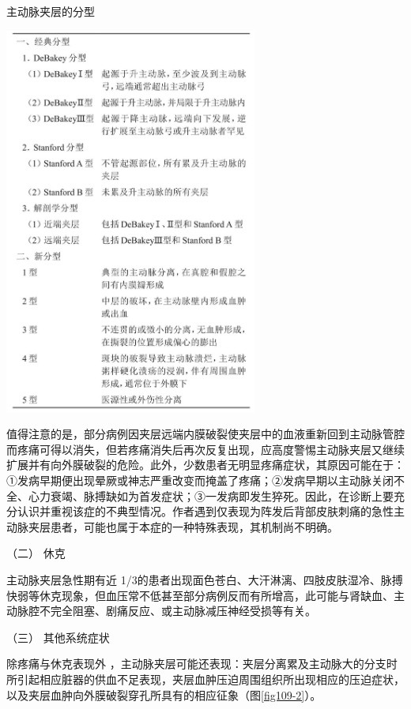 \begin{table}[htbp]
\centering
\caption{主动脉夹层的分型}
\label{tab109-1}
\includegraphics[width=3.27083in,height=5.03125in]{./images/Image00484.jpg}
\end{table}

值得注意的是，部分病例因夹层远端内膜破裂使夹层中的血液重新回到主动脉管腔而疼痛可得以消失，但若疼痛消失后再次反复出现，应高度警惕主动脉夹层又继续扩展并有向外膜破裂的危险。此外，少数患者无明显疼痛症状，其原因可能在于：①发病早期便出现晕厥或神志严重改变而掩盖了疼痛；②发病早期以主动脉关闭不全、心力衰竭、脉搏缺如为首发症状；③一发病即发生猝死。因此，在诊断上要充分认识并重视该症的不典型情况。作者遇到仅表现为阵发后背部皮肤刺痛的急性主动脉夹层患者，可能也属于本症的一种特殊表现，其机制尚不明确。

\hypertarget{text00314.htmlux5cux23CHP10-9-2-1-2}{}
（二） 休克

主动脉夹层急性期有近
1/3的患者出现面色苍白、大汗淋漓、四肢皮肤湿冷、脉搏快弱等休克现象，但血压常不低甚至部分病例反而有所增高，此可能与肾缺血、主动脉腔不完全阻塞、剧痛反应、或主动脉减压神经受损等有关。

\hypertarget{text00314.htmlux5cux23CHP10-9-2-1-3}{}
（三） 其他系统症状

除疼痛与休克表现外
，主动脉夹层可能还表现：夹层分离累及主动脉大的分支时所引起相应脏器的供血不足表现，夹层血肿压迫周围组织所出现相应的压迫症状，以及夹层血肿向外膜破裂穿孔所具有的相应征象（图\ref{fig109-2}）。

